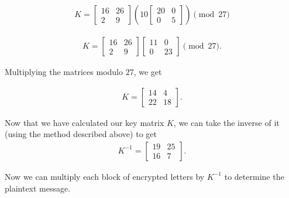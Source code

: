 \documentclass{article}
\begin{document}
\begin{align*}
    K = 
    \begin{bmatrix}
        16 & 26\\
        2 & 9
    \end{bmatrix}
    \left( 10
    \begin{bmatrix}
        20 & 0\\
        0 & 5
    \end{bmatrix}
    \right) \pmod {27}
\end{align*}

\begin{align*}
    K = 
    \begin{bmatrix}
        16 & 26\\
        2 & 9
    \end{bmatrix}
    \begin{bmatrix}
        11 & 0\\
        0 & 23
    \end{bmatrix}
    \pmod {27}.
\end{align*}

Multiplying the matrices modulo $27$, we get

\begin{align*}
    K = 
    \begin{bmatrix}
        14 & 4\\
        22 & 18
    \end{bmatrix}.
\end{align*}

Now that we have calculated our key matrix $K$, we can take the inverse of it (using the method described above) to get 
\begin{align*}
    K^{-1} =
    \begin{bmatrix}
        19 & 25\\
        16 & 7
    \end{bmatrix}.
\end{align*}

Now we can multiply each block of encrypted letters by $K^{-1}$ to determine the plaintext message.
\end{document}
